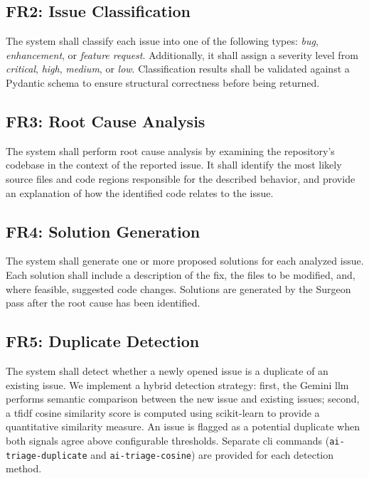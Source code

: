 \subsection{FR2: Issue Classification}

The system shall classify each issue into one of the following types: \textit{bug}, \textit{enhancement}, or \textit{feature request}. Additionally, it shall assign a severity level from \textit{critical}, \textit{high}, \textit{medium}, or \textit{low}. Classification results shall be validated against a Pydantic schema to ensure structural correctness before being returned.

\subsection{FR3: Root Cause Analysis}

The system shall perform root cause analysis by examining the repository's codebase in the context of the reported issue. It shall identify the most likely source files and code regions responsible for the described behavior, and provide an explanation of how the identified code relates to the issue.

\subsection{FR4: Solution Generation}

The system shall generate one or more proposed solutions for each analyzed issue. Each solution shall include a description of the fix, the files to be modified, and, where feasible, suggested code changes. Solutions are generated by the Surgeon pass after the root cause has been identified.

\subsection{FR5: Duplicate Detection}

The system shall detect whether a newly opened issue is a duplicate of an existing issue. We implement a hybrid detection strategy: first, the Gemini \gls{llm} performs semantic comparison between the new issue and existing issues; second, a \gls{tfidf} cosine similarity score is computed using scikit-learn to provide a quantitative similarity measure. An issue is flagged as a potential duplicate when both signals agree above configurable thresholds. Separate \gls{cli} commands (\texttt{ai-triage-duplicate} and \texttt{ai-triage-cosine}) are provided for each detection method.

